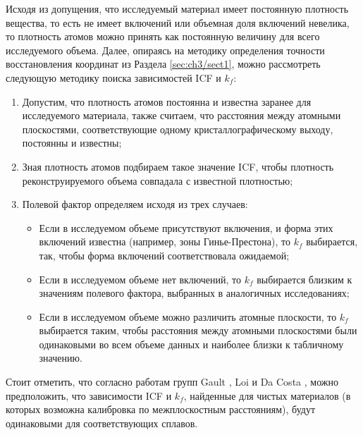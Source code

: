 Исходя из допущения, что исследуемый материал имеет постоянную плотность вещества, то есть не имеет включений или объемная доля включений невелика, то плотность атомов можно принять как постоянную величину для всего исследуемого объема. Далее, опираясь на методику определения точности восстановления координат из Раздела \cref{sec:ch3/sect1}, можно рассмотреть следующую методику поиска зависимостей ICF и $k_f$:

\begin{enumerate}[beginpenalty=10000] %
	\item Допустим, что плотность атомов постоянна и известна заранее для исследуемого материала, также считаем, что расстояния между атомными плоскостями, соответствующие одному кристаллографическому выходу, постоянны и известны;
	\item Зная плотность атомов подбираем такое значение ICF, чтобы плотность реконструируемого объема совпадала с известной плотностью;
	\item Полевой фактор определяем исходя из трех случаев:
	\begin{itemize} [beginpenalty=10000]
		\item Если в исследуемом объеме присутствуют включения, и форма этих включений известна (например, зоны Гинье-Престона), то $k_f$ выбирается, так, чтобы форма включений соответствовала ожидаемой;
		\item Если в исследуемом объеме нет включений, то $k_f$ выбирается близким к значениям полевого фактора, выбранных в аналогичных исследованиях;
		\item Если в исследуемом объеме можно различить атомные плоскости, то $k_f$ выбирается таким, чтобы расстояния между атомными плоскостями были одинаковыми во всем объеме данных и наиболее близки к табличному значению.
	\end{itemize}
\end{enumerate}

Стоит отметить, что согласно работам групп Gault \cite{Gault11_Loi}, Loi \cite{Loi13} и Da Costa \cite{Hatzoglou19}, можно предположить, что зависимости ICF и $k_f$, найденные для чистых материалов (в которых возможна калибровка по межплоскостным расстояниям), будут одинаковыми для соответствующих сплавов.



